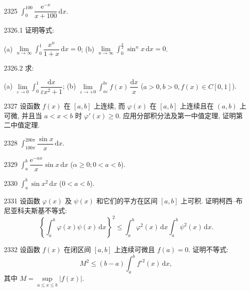 \begin{prob}[S]{2325}
$\int_{0}^{100} \dfrac{\mathrm{e}^{-x}}{x + 100}\,\mathrm{d}x$.
\end{prob}

\begin{prob}[M]{2326.1}
证明等式:

(a) $\lim\limits_{n\to\infty} \int_{0}^{1} \dfrac{x^n}{1 + x}\,\mathrm{d}x = 0$; \qquad (b) $\lim\limits_{n\to\infty} \int_{0}^{\frac{\pi}{2}} \sin^n x\,\mathrm{d}x = 0$.
\end{prob}

\begin{prob}[M]{2326.2}
求:

(a) $\lim\limits_{\varepsilon\to 0} \int_{0}^{1} \dfrac{\mathrm{d}x}{\varepsilon x^2 + 1}$; \qquad (b) $\lim\limits_{\varepsilon\to+0} \int_{a\varepsilon}^{b\varepsilon} f(x)\,\dfrac{\mathrm{d}x}{x}$ ($a > 0, b > 0, f(x) \in C[0, 1]$).
\end{prob}

\begin{prob}[M]{2327}
设函数 $f(x)$ 在 $[a, b]$ 上连续, 而 $\varphi(x)$ 在 $[a, b]$ 上连续且在 $(a, b)$ 上可微, 并且当 $a < x < b$ 时 $\varphi'(x) \geqslant 0$. 应用分部积分法及第一中值定理, 证明第二中值定理.
\end{prob}


\begin{prob}[S]{2328}
$\int_{100\pi}^{200\pi} \dfrac{\sin x}{x}\,\mathrm{d}x$.
\end{prob}

\begin{prob}[S]{2329}
$\int_{a}^{b} \dfrac{\mathrm{e}^{-\alpha x}}{x}\sin x\,\mathrm{d}x$ ($\alpha \geqslant 0; 0 < a < b$).
\end{prob}

\begin{prob}[S]{2330}
$\int_{a}^{b} \sin x^2\,\mathrm{d}x$ ($0 < a < b$).
\end{prob}

\begin{prob}[M]{2331}
设函数 $\varphi(x)$ 及 $\psi(x)$ 和它们的平方在区间 $[a, b]$ 上可积. 证明柯西--布尼亚科夫斯基不等式:
\[
\left\{ \int_{a}^{b} \varphi(x)\psi(x)\,\mathrm{d}x \right\}^2 \leqslant \int_{a}^{b} \varphi^2(x)\,\mathrm{d}x \int_{a}^{b} \psi^2(x)\,\mathrm{d}x.
\]
\end{prob}

\begin{prob}[M]{2332}
设函数 $f(x)$ 在闭区间 $[a, b]$ 上连续可微且 $f(a) = 0$. 证明不等式:
\[
M^2 \leqslant (b - a) \int_{a}^{b} f'^2(x)\,\mathrm{d}x,
\]
其中 $M = \sup\limits_{a \leqslant x \leqslant b} |f(x)|$.
\end{prob}

